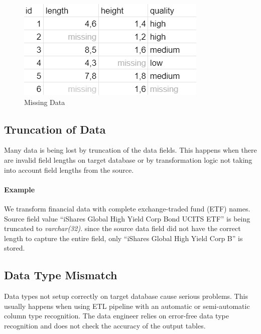 \begin{figure}[htb]
    \centering
    \includegraphics[width=.5\textwidth]{figures/missing-data.png}
    \caption{Missing Data}
    \label{fig:missing-data}
\end{figure}
\FloatBarrier

\subsection*{Truncation of Data}

Many data is being lost by truncation of the data fields.
This happens when there are invalid field lengths on target database or by transformation logic not taking into account field lengths from the source.

\paragraph*{Example} We transform financial data with complete exchange-traded fund (ETF) names.
Source field value \enquote{iShares Global High Yield Corp Bond UCITS ETF} is being truncated to \textit{varchar(32)}.
since the source data field did not have the correct length to capture the entire field, only \enquote{iShares Global High Yield Corp B} is stored.


\subsection*{Data Type Mismatch}

Data types not setup correctly on target database cause serious problems.
This usually happens when using ETL pipeline with an automatic or semi-automatic column type recognition.
The data engineer relies on error-free data type recognition and does not check the accuracy of the output tables.

